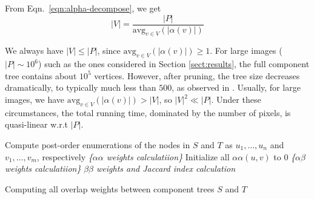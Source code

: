 \def\avg{\mathrm{avg}}

From Eqn.~\eqref{eqn:alpha-decompose}, we get
\begin{equation*}
|V| = \frac{|P|}{\avg_{v\in V}(|\alpha(v)|)} 
\end{equation*}

We always have $|V|\le|P|$, since $\avg_{v\in V}(|\alpha(v)|) \ge 1$.
For large images ($|P| \sim 10^6$) such as the ones considered in Section
\ref{sect:results}, the full component tree contains about $10^5$ vertices.  
However, after pruning, the tree size decreases dramatically, to typically much
less than $500$, as observed in \cite{Xiao:2011}.  
Usually, for large images, we have $\avg_{v\in V}(|\alpha(v)|) > |V|$, so $|V|^2
\ll |P|$. Under these circumstances, the total running time, dominated by the
number of pixels, is quasi-linear w.r.t $|P|$.

\begin{algorithm}[H]
\SetAlgoLined
{}
Compute post-order enumerations of the nodes in $S$ and $T$ as $u_1,\ldots,u_n$ and $v_1, \ldots, v_m$, respectively\;
\emph{\{$\alpha\alpha$ weights calculatiion\}}\;
Initialize all $\alpha\alpha(u,v)$ to 0\;
\emph{\{$\alpha\beta$ weights calculatiion\}}\;
\emph{$\beta\beta$ weights and Jaccard index calculation}\;
\caption{Computing all overlap weights between component trees $S$ and $T$}
\label{alg:cptree-weights}
\end{algorithm}

